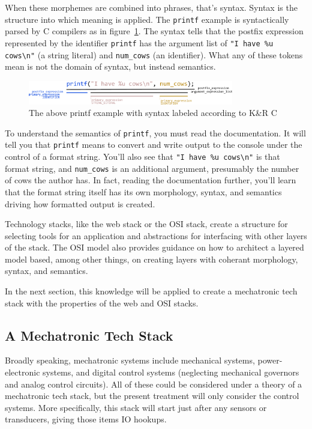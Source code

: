 \documentclass[english,12pt,a4paper,pdftex,eng,utf8]{aaltothesis}
\begin{document}
When these morphemes are combined into phrases, that's syntax.  Syntax is the structure into which meaning is applied.  The \verb|printf| example is syntactically parsed by C compilers as in figure~\ref{fig:printf_syntax}.  The syntax tells that the postfix expression represented by the identifier \verb|printf| has the argument list of \verb|"I have %u cows\n"| (a string literal) and \verb|num_cows| (an identifier).  What any of these tokens mean is not the domain of syntax, but instead semantics.

\begin{figure}[h]
  \centering
  \includegraphics[width=0.8\textwidth]{assets/printf_syntax}
  \caption{The above printf example with syntax labeled according to K{\&}R C~\cite{Kernighan1978}}\label{fig:printf_syntax}
\end{figure}

To understand the semantics of \verb|printf|, you must read the documentation.  It will tell you that \verb|printf| means to convert and write output to the console under the control of a format string.  You'll also see that \verb|"I have %u cows\n"| is that format string, and \verb|num_cows| is an additional argument, presumably the number of cows the author has.  In fact, reading the documentation further, you'll learn that the format string itself has its own morphology, syntax, and semantics driving how formatted output is created.

Technology stacks, like the web stack or the OSI stack, create a structure for selecting tools for an application and abstractions for interfacing with other layers of the stack.  The OSI model also provides guidance on how to architect a layered model based, among other things, on creating layers with coherant morphology, syntax, and semantics.

In the next section, this knowledge will be applied to create a mechatronic tech stack with the properties of the web and OSI stacks.

\subsection{A Mechatronic Tech Stack}

Broadly speaking, mechatronic systems include mechanical systems, power-electronic systems, and digital control systems (neglecting mechanical governors and analog control circuits).  All of these could be considered under a theory of a mechatronic tech stack, but the present treatment will only consider the control systems.  More specifically, this stack will start just after any sensors or transducers, giving those items IO hookups.
\end{document}
